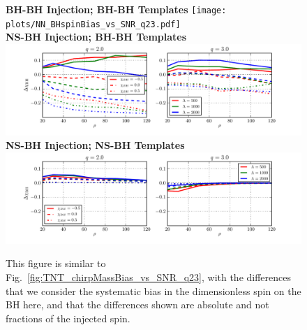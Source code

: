 \documentclass[aps,prd,amsmath,floats,floatfix, twocolumn,
superscriptaddress,nofootinbib,showpacs]{revtex4-1}
\begin{document}
% 
\begin{figure}[h]
\centering    
\textbf{BH-BH Injection; BH-BH Templates}
\texttt{[image: plots/NN\_BHspinBias\_vs\_SNR\_q23.pdf]}\\ 
\textbf{NS-BH Injection; BH-BH Templates}
\includegraphics[width=1.85\columnwidth]{plots/TN_BHspinBias_vs_SNR_q23.pdf}\\ 
\textbf{NS-BH Injection; NS-BH Templates}
\includegraphics[width=1.85\columnwidth]{plots/TT_BHspinBias_vs_SNR_q23.pdf}%
\caption{This figure is similar to Fig.~\ref{fig:TNT_chirpMassBias_vs_SNR_q23},
with the differences that we consider the systematic bias in the dimensionless
spin on the BH here, and that the differences shown are absolute and not
fractions of the injected spin.}
\label{fig:TNT_BHspinBias_vs_SNR_q23}
\end{figure}
% 
\end{document}
